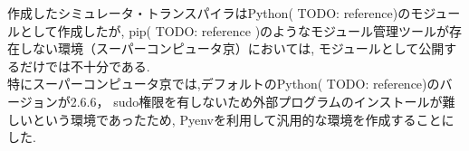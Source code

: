 作成したシミュレータ・トランスパイラはPython( TODO: reference)のモジュールとして作成したが,
pip( TODO: reference )のようなモジュール管理ツールが存在しない環境（スーパーコンピュータ京）においては,
モジュールとして公開するだけでは不十分である.\\
特にスーパーコンピュータ京では,デフォルトのPython( TODO: reference)のバージョンが2.6.6，
sudo権限を有しないため外部プログラムのインストールが難しいという環境であったため,
Pyenvを利用して汎用的な環境を作成することにした.\\
